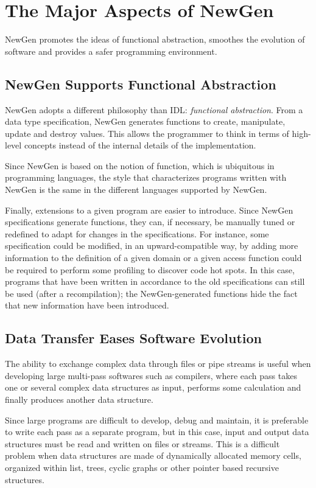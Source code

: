 \section{The Major Aspects of NewGen}

NewGen promotes the ideas of functional abstraction, smoothes the evolution
of software and provides a safer programming environment.

\subsection*{NewGen Supports Functional Abstraction} 

NewGen adopts a different philosophy than IDL: {\em functional
abstraction}. From a data type specification, NewGen generates functions
to create, manipulate, update and destroy values. This allows the
programmer to think in terms of high-level concepts instead of the
internal details of the implementation.

Since NewGen is based on the notion of function, which is ubiquitous in
programming languages, the style that characterizes programs written
with NewGen is the same in the different languages supported by NewGen.

Finally, extensions to a given program are easier to introduce. Since
NewGen specifications generate functions, they can, if necessary, be
manually tuned or redefined to adapt for changes in the specifications.
For instance, some specification could be modified, in an
upward-compatible way, by adding more information to the definition of a
given domain or a given access function could be required to perform
some profiling to discover code hot spots. In this case,
programs that have been written in accordance to the old specifications
can still be used (after a recompilation); the NewGen-generated
functions hide the fact that new information have been introduced.

\subsection*{Data Transfer Eases Software Evolution}

The ability to exchange complex data through files or pipe streams is
useful when developing large multi-pass softwares such as compilers,
where each pass takes one or several complex data structures as input,
performs some calculation and finally produces another data structure.

Since large programs are difficult to develop, debug and maintain, it is
preferable to write each pass as a separate program, but in this case,
input and output data structures must be read and written on files or
streams.  This is a difficult problem when data structures are made of
dynamically allocated memory cells, organized within list, trees, cyclic
graphs or other pointer based recursive structures.

